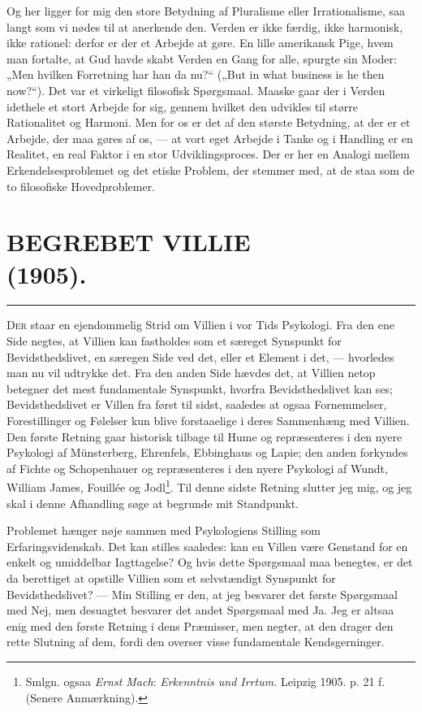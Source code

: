 \documentclass[12pt,a4paper,openany]{book}
\newcommand{\opage}[1]{\marginnote{\footnotesize\textit{[#1]}}}
\newcommand{\essay}[2][]{\chapter*{#2}\addcontentsline{toc}{chapter}{#1}}   %
\newcommand{\streg}{\begin{center}\rule{3em}{0.4pt}\end{center}}
\begin{document}
Og her ligger for mig den store Betydning af Pluralisme
eller Irrationalisme, saa langt som vi nødes til at anerkende
den. Verden er ikke færdig, ikke harmonisk, ikke rationel: derfor
er der et Arbejde at gøre. En lille amerikansk Pige, hvem
man fortalte, at Gud havde skabt Verden en Gang for alle,
spurgte sin Moder: „Men hvilken Forretning har han da nu?“ („But in what business is he then now?“). Det var et virkeligt
filosofisk Spørgsmaal. Maaske gaar der i Verden idethele et
\setcounter{footnote}{0}%
\opage{27}stort Arbejde for sig, gennem hvilket den udvikles til større
Rationalitet og Harmoni. Men for os er det af den største Betydning,
at der er et Arbejde, der maa gøres af os, --- at vort
eget Arbejde i Tanke og i Handling er en Realitet, en real
Faktor i en stor Udviklingsproces. Der er her en Analogi mellem
Erkendelsesproblemet og det etiske Problem, der stemmer
med, at de staa som de to filosofiske Hovedproblemer.

\setcounter{footnote}{0}%
\opage{28}\essay[Begrebet Villie (1905; 1912)]{BEGREBET VILLIE \\ (1905).}
\streg

D\textsc{er} staar en ejendommelig Strid om Villien i vor Tids
Psykologi. Fra den ene Side negtes, at Villien kan
fastholdes som et særeget Synspunkt for Bevidsthedslivet, en
særegen Side ved det, eller et Element i det, --- hvorledes man
nu vil udtrykke det. Fra den anden Side hævdes det, at Villien
netop betegner det mest fundamentale Synspunkt, hvorfra Bevidsthedslivet
kan ses; Bevidsthedslivet er Villen fra først til
sidst, saaledes at ogsaa Fornemmelser, Forestillinger og Følelser
kun blive forstaaelige i deres Sammenhæng med Villien. Den
første Retning gaar historisk tilbage til Hume og repræsenteres
i den nyere Psykologi af Münsterberg, Ehrenfels, Ebbinghaus
og Lapie; den anden forkyndes af Fichte og Schopenhauer og
repræsenteres i den nyere Psykologi af Wundt, William James,
Fouillée og Jodl\footnote[1]{Smlgn. ogsaa \emph{Ernst Mach}: \textit{Erkenntnis und Irrtum.} Leipzig 1905. p. 21 f. (Senere Anmærkning).}. Til denne sidste Retning slutter jeg mig,
og jeg skal i denne Afhandling søge at begrunde mit Standpunkt.


Problemet hænger nøje sammen med Psykologiens Stilling
som Erfaringsvidenskab. Det kan stilles saaledes: kan en Villen
være Genstand for en enkelt og umiddelbar Iagttagelse? Og
hvis dette Spørgsmaal maa benegtes, er det da berettiget at
\setcounter{footnote}{0}%
\opage{29}opstille Villien som et selvstændigt Synspunkt for Bevidsthedslivet?
--- Min Stilling er den, at jeg besvarer det første Spørgsmaal
med Nej, men desuagtet besvarer det andet Spørgsmaal
med Ja. Jeg er altsaa enig med den første Retning i dens Præmisser,
men negter, at den drager den rette Slutning af dem,
fordi den overser visse fundamentale Kendsgerninger.
\end{document}
